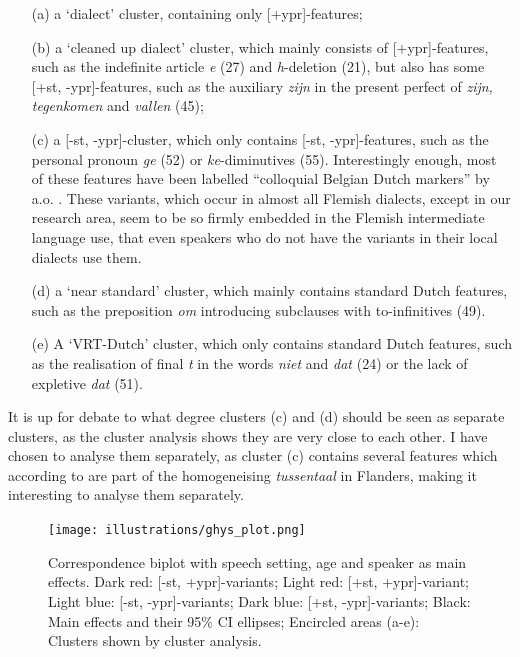 \documentclass[output=paper]{LSP/langsci}
\begin{document}
\begin{itemize}
\item[(a)] a ‘dialect’ cluster, containing only [+ypr]-features;
\item[(b)] a ‘cleaned up dialect’ cluster, which mainly consists of [+ypr]-features, such as the indefinite article\textit{ e} (27) and \textit{h}-deletion (21), but also has some [+st, -ypr]-features, such as the auxiliary \textit{zijn} in the present perfect of \textit{zijn, tegenkomen} and \textit{vallen} (45);
\item[(c)] a [-st, -ypr]-cluster, which only contains [-st, -ypr]-features, such as the personal pronoun \textit{ge} (52) or \textit{ke}{}-diminutives (55). Interestingly enough, most of these features have been labelled “colloquial Belgian Dutch markers” by a.o. \citet[534--5]{hinskens_supra-regional_2013}. These variants, which occur in almost all Flemish dialects, except in our research area, seem to be so firmly embedded in the Flemish intermediate language use, that even speakers who do not have the variants in their local dialects use them.
\item[(d)] a ‘near standard’ cluster, which mainly contains standard Dutch features, such as the preposition \textit{om} introducing subclauses with to-infinitives (49). 
\item[(e)] A ‘VRT-Dutch’ cluster, which only contains standard Dutch features, such as the realisation of final \textit{t} in the words \textit{niet} and \textit{dat} (24) or the lack of expletive \textit{dat} (51).
\end{itemize}

It is up for debate to what degree clusters (c) and (d) should be seen as separate clusters, as the cluster analysis shows they are very close to each other. I have chosen to analyse them separately, as cluster (c) contains several features which according to \citet{taeldeman_zich_2008} are part of the homogeneising \textit{tussentaal} in Flanders, making it interesting to analyse them separately. 

\begin{figure}
\texttt{[image: illustrations/ghys\_plot.png]}
\caption{Correspondence biplot with speech setting, age and speaker as main effects. Dark red: [-st, +ypr]-variants; 
Light red: [+st, +ypr]-variant;
Light blue: [-st, -ypr]-variants;
Dark blue: [+st, -ypr]-variants;
Black: Main effects and their 95\% CI ellipses;
Encircled areas (a-e): Clusters shown by cluster analysis.}
\label{fig:2}
\end{figure}
\end{document}
